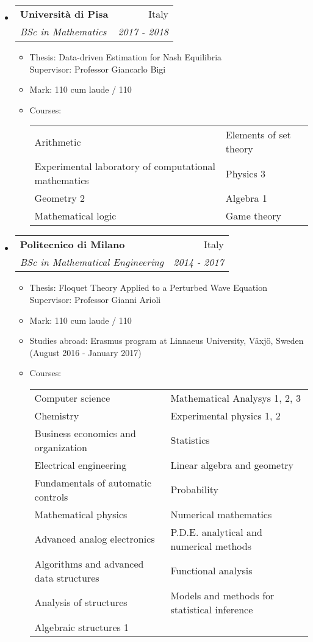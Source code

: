 \documentclass[letterpaper,11pt]{article}
\makeatletter
\newcommand{\resitem}[1]{\item #1 \vspace{-2pt}}
\newcommand{\ressubheading}[4]{
\begin{tabular*}{6.5in}{l@{\cftdotfill{\cftsecdotsep}\extracolsep{\fill}}r}
		\textbf{#1} & #2 \\
		\textit{#3} & \textit{#4} \\
\end{tabular*}\vspace{-6pt}}
\makeatother
\begin{document}
\begin{itemize}
\item[] \ressubheading{Universit\`a di Pisa}{Italy}{BSc in Mathematics}{2017 - 2018}

\begin{itemize}
	\resitem{Thesis: Data-driven Estimation for Nash Equilibria \\
	Supervisor: Professor Giancarlo Bigi}
	\resitem{Mark: 110 cum laude / 110}
	\resitem{Courses:\\ \begin{tabular}{p{}@{\hskip 2em} p{0.4 \textwidth}}
	Arithmetic & Elements of set theory \\
	Experimental laboratory of computational mathematics & Physics 3 \\
	Geometry 2 & Algebra 1 \\
	Mathematical logic & Game theory
	
	\end{tabular}}
\end{itemize}

\item[] \ressubheading{Politecnico di Milano}{Italy}{BSc in Mathematical Engineering}{2014 - 2017}

\begin{itemize}
	\resitem{Thesis: Floquet Theory Applied to a Perturbed Wave Equation \\
	Supervisor: Professor Gianni Arioli}
	\resitem{Mark: 110 cum laude / 110}
	\resitem{Studies abroad: Erasmus program at Linnaeus University, V\"axj\"o, Sweden (August 2016 - January 2017)}
	\resitem{Courses:\\ \begin{tabular}{p{}@{\hskip 2em} p{0.4 \textwidth}}
	Computer science & Mathematical Analysys 1, 2, 3 \\
	Chemistry & Experimental physics 1, 2 \\
	Business economics and organization & Statistics \\
	Electrical engineering & Linear algebra and geometry\\
	Fundamentals of automatic controls & Probability \\
	Mathematical physics & Numerical mathematics\\
	Advanced analog electronics & P.D.E. analytical and numerical methods \\
	Algorithms and advanced data structures & Functional analysis \\
	Analysis of structures & Models and methods for statistical inference \\
	Algebraic structures 1
	\end{tabular}	 }
\end{itemize}
\end{itemize}
\end{document}
